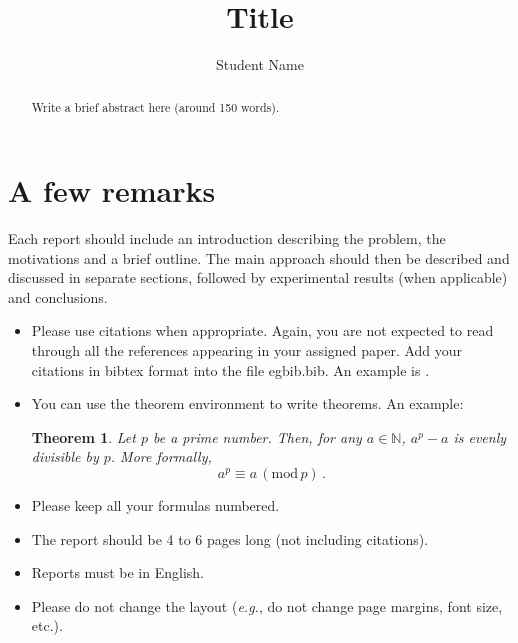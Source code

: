 \documentclass[a4paper,10pt]{article}
\title{Title} %
\author{Student Name} %
\institute{\textit{Seminar: Optimization and Generalization in Deep Learning}}
\newtheorem{theorem}{Theorem}
\begin{document}
\maketitle

\begin{abstract}
Write a brief abstract here (around 150 words).
\end{abstract}

\section{A few remarks}

Each report should include an introduction describing the problem, the motivations and a brief outline. The main approach should then be described and discussed in separate sections, followed by experimental results (when applicable) and conclusions.

\begin{itemize}
\item Please use citations when appropriate. Again, you are not expected to read through all the references appearing in your assigned paper. Add your citations in bibtex format into the file egbib.bib. An example is \cite{dijkstra59}.
\item You can use the theorem environment to write theorems. An example:
\begin{theorem}
\label{mytheorem}
Let $p$ be a prime number. Then, for any $a \in \mathbb{N}$, $a^p - a$ is evenly divisible by $p$. More formally,
\begin{equation}
a^p \equiv a \, (\mathrm{mod}\, p)\,.
\end{equation}
\end{theorem}
\item Please keep all your formulas numbered.
\item The report should be 4 to 6 pages long (not including citations).
\item Reports must be in English.
\item Please do not change the layout ({\em e.g.}, do not change page margins, font size, etc.).
\end{itemize}
	


\end{document}
